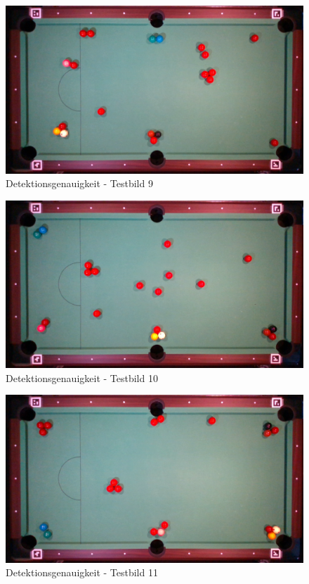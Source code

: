 \begin{figure}[h!]
    \begin{center}
        \includegraphics[width=0.8\linewidth]{../common/07_appendix/resources/00_detection/08_detektion_testbild_9.png}
    \end{center}
    \caption{Detektionsgenauigkeit - Testbild 9}
    \label{fig:detektionsgenauigkeit:testbild:9}
\end{figure}
\begin{figure}[h!]
    \begin{center}
        \includegraphics[width=0.8\linewidth]{../common/07_appendix/resources/00_detection/09_detektion_testbild_10.png}
    \end{center}
    \caption{Detektionsgenauigkeit - Testbild 10}
    \label{fig:detektionsgenauigkeit:testbild:10}
\end{figure}
\begin{figure}[h!]
    \begin{center}
        \includegraphics[width=0.8\linewidth]{../common/07_appendix/resources/00_detection/10_detektion_testbild_11.png}
    \end{center}
    \caption{Detektionsgenauigkeit - Testbild 11}
    \label{fig:detektionsgenauigkeit:testbild:11}
\end{figure}
